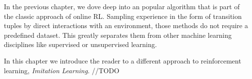 In the previous chapter, we dove deep into an popular algorithm that is part of the classic approach of online RL. Sampling experience in the form of transition tuples by direct interactions with an environment, those methods do not require a predefined dataset. This greatly separates them from other machine learning disciplines like supervised or unsupervised learning.
\par 
In this chapter we introduce the reader to a different approach to reinforcement learning, \textit{Imitation Learning}. //TODO